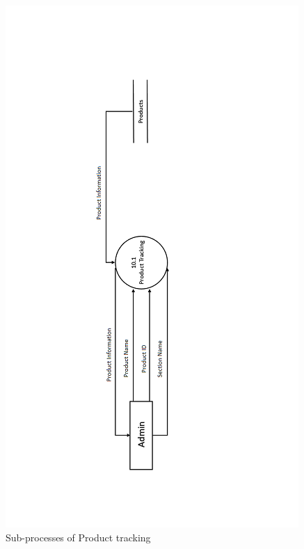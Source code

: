 \begin{figure}
 \centering
\includegraphics{figures/10final.png}
\caption{Sub-processes of Product tracking}
\end{figure}



